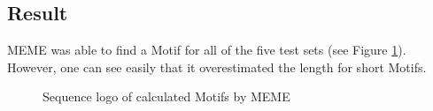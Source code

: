 \documentclass[%
   10pt,              %
   nenglish,           %
   a4paper,           %
   DIV11,             %
]{scrartcl}%
\begin{document}
\subsection*{Result}

MEME was able to find a Motif for all of the five test sets (see Figure \ref{fig:memeLogo}). However, 
one can see easily that it overestimated the length for short Motifs. 

\begin{figure}[ht]
 \centering
 \caption{Sequence logo of calculated Motifs by MEME}
 \label{fig:memeLogo}
\end{figure}
\end{document}
